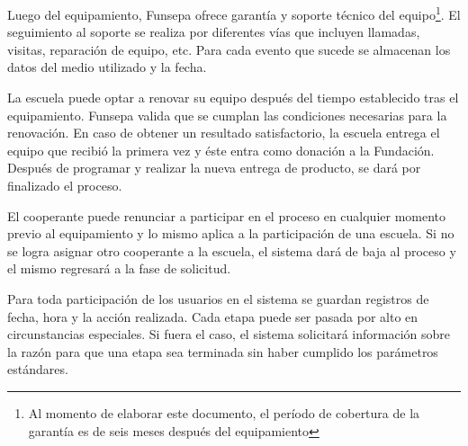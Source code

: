\documentclass[11pt]{report}
\begin{document}
	Luego del equipamiento, Funsepa ofrece garantía y soporte técnico del equipo\footnote{Al momento de elaborar este documento, el período de cobertura de la garantía es de seis meses después del equipamiento}. El seguimiento al soporte se realiza por diferentes vías que incluyen llamadas, visitas, reparación de equipo, etc. Para cada evento que sucede se almacenan los datos del medio utilizado y la fecha.
	
	La escuela puede optar a renovar su equipo después del tiempo establecido tras el equipamiento. Funsepa valida que se cumplan las condiciones necesarias para la renovación. En caso de obtener un resultado satisfactorio, la escuela entrega el equipo que recibió la primera vez y éste entra como donación a la Fundación. Después de programar y realizar la nueva entrega de producto, se dará por finalizado el proceso.
	
	El cooperante puede renunciar a participar en el proceso en cualquier momento previo al equipamiento y lo mismo aplica a la participación de una escuela. Si no se logra asignar otro cooperante a la escuela, el sistema dará de baja al proceso y el mismo regresará a la fase de solicitud.
	
	Para toda participación de los usuarios en el sistema se guardan registros de fecha, hora y la acción realizada. Cada etapa puede ser pasada por alto en circunstancias especiales. Si fuera el caso, el sistema solicitará información sobre la razón para que una etapa sea terminada sin haber cumplido los parámetros estándares.
	
\end{document}
